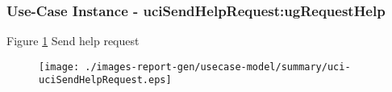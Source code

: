 
	\subsubsection{Use-Case Instance - uciSendHelpRequest:ugRequestHelp}
	

	
	Figure \ref{fig:lu.uni.lassy.excalibur.g01.specification-RE-UC-uci-uciSendHelpRequest}
	Send help request
	
	\begin{figure}[htbp]
	\begin{center}
	
	\texttt{[image: ./images-report-gen/usecase-model/summary/uci-uciSendHelpRequest.eps]}
	\end{center}
	\caption[lu.uni.lassy.excalibur.g01.specification Sequence Diagram: uci-uciSendHelpRequest]{}
	\label{fig:lu.uni.lassy.excalibur.g01.specification-RE-UC-uci-uciSendHelpRequest}
	\end{figure}
	\vspace{0.5cm}

